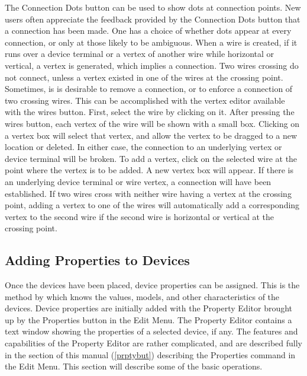 The {\cb Connection Dots} button can be used to show dots at
connection points.  New users often appreciate the feedback provided
by the {\cb Connection Dots} button that a connection has been made. 
One has a choice of whether dots appear at every connection, or only
at those likely to be ambiguous.  When a wire is created, if it runs
over a device terminal or a vertex of another wire while horizontal or
vertical, a vertex is generated, which implies a connection.  Two
wires crossing do not connect, unless a vertex existed in one of the
wires at the crossing point.  Sometimes, is is desirable to remove a
connection, or to enforce a connection of two crossing wires.  This
can be accomplished with the vertex editor available with the {\cb
wires} button.  First, select the wire by clicking on it.  After
pressing the {\cb wires} button, each vertex of the wire will be shown
with a small box.  Clicking on a vertex box will select that vertex,
and allow the vertex to be dragged to a new location or deleted.  In
either case, the connection to an underlying vertex or device terminal
will be broken.  To add a vertex, click on the selected wire at the
point where the vertex is to be added.  A new vertex box will appear. 
If there is an underlying device terminal or wire vertex, a connection
will have been established.  If two wires cross with neither wire
having a vertex at the crossing point, adding a vertex to one of the
wires will automatically add a corresponding vertex to the second wire
if the second wire is horizontal or vertical at the crossing point.

\subsection{Adding Properties to Devices}

Once the devices have been placed, device properties can be assigned. 
This is the method by which {\Xic} knows the values, models, and other
characteristics of the devices.  Device properties are initially added
with the {\cb Property Editor} brought up by the {\cb Properties}
button in the {\cb Edit Menu}.  The {\cb Property Editor} contains a
text window showing the properties of a selected device, if any.  The
features and capabilities of the {\cb Property Editor} are rather
complicated, and are described fully in the section of this manual
(\ref{prptybut}) describing the {\cb Properties} command in the {\cb
Edit Menu}.  This section will describe some of the basic operations.

